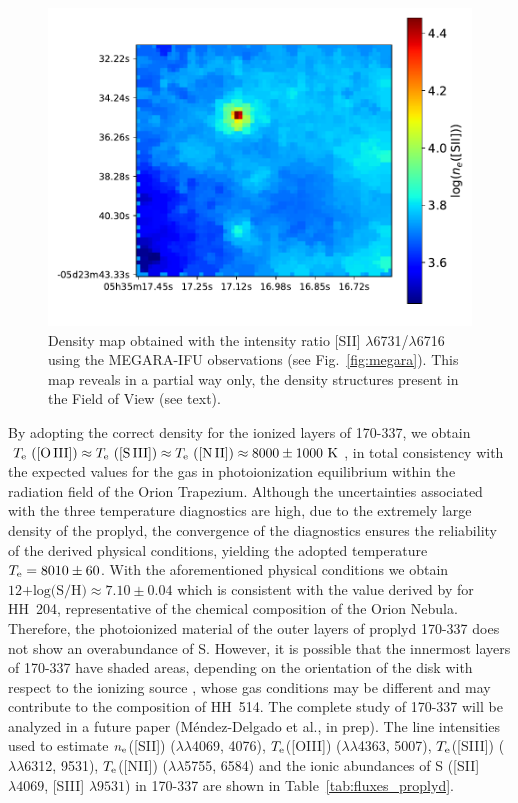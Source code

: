 \documentclass[fleqn,usenatbib]{mnras}
\begin{document}
\begin{figure}
\includegraphics[width=\columnwidth]{density_map.pdf}
\caption{Density map obtained with the intensity ratio [S\thinspace II] $\lambda$6731/$\lambda$6716 using the MEGARA-IFU observations (see Fig.~\ref{fig:megara}). This map reveals in a partial way only, the density structures present in the Field of View (see text).}
\label{fig:density_map}
\end{figure}


By adopting the correct density for the ionized layers of 170-337, we obtain $T_{\rm e} \text{ ([O\thinspace III])} \approx T_{\rm e} \text{ ([S\thinspace III])} \approx T_{\rm e} \text{ ([N\thinspace II])} \approx 8000 \pm 1000 \text{ K}$, in total consistency with the expected values for the gas in photoionization equilibrium within the radiation field of the Orion Trapezium. Although the uncertainties associated with the three temperature diagnostics are high, due to the extremely large density of the proplyd, the convergence of the diagnostics ensures the reliability of the derived physical conditions, yielding the adopted temperature $T_{\rm e}=8010 \pm 60$. With the aforementioned physical conditions we obtain $\text{12+log(S/H)} \approx 7.10 \pm 0.04 $ which is consistent with the value derived by \citet{mendez2021-2} for HH~204, representative of the chemical composition of the Orion Nebula. Therefore, the photoionized material of the outer layers of proplyd 170-337 does not show an overabundance of S. However, it is possible that the innermost layers of 170-337 have shaded areas, depending on the orientation of the disk with respect to the ionizing source \citep[see Fig.~5 from][]{henney99}, whose gas conditions may be different and may contribute to the composition of HH~514. The complete study of 170-337 will be analyzed in a future paper (M\'endez-Delgado et al., in prep). The line intensities used to estimate $n_{\rm e}$([S\thinspace II]) ($\lambda\lambda$4069, 4076), $T_{\rm e}$([O\thinspace III]) ($\lambda\lambda$4363, 5007), $T_{\rm e}$([S\thinspace III]) ($\lambda\lambda$6312, 9531), $T_{\rm e}$([N\thinspace II]) ($\lambda\lambda$5755, 6584)   
and the ionic abundances of S ([S\thinspace II] $\lambda 4069$, [S\thinspace III] $\lambda 9531$) in 170-337 are shown in Table~\ref{tab:fluxes_proplyd}. 
\end{document}
